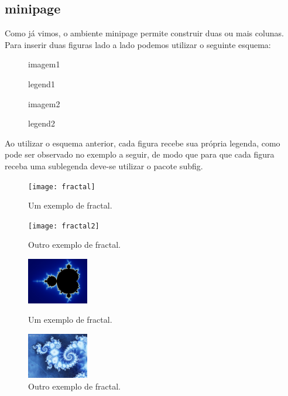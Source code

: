 \subsection{\textsf{minipage}}

Como já vimos, o ambiente \textsf{minipage} permite construir duas ou mais colunas. Para inserir duas figuras lado a lado podemos utilizar o seguinte esquema:
\begin{latexcode}
    \begin{figure}[place]
        \begin{minipage}[pos]{width}
            imagem1
            \caption{legend1}
            \label{P:imagem1}
        \end{minipage}\hfill
        \begin{minipage}[pos]{width}
            imagem2
            \caption{legend2}
            \label{P:imagem2}
        \end{minipage}
    \end{figure}
\end{latexcode}

Ao utilizar o esquema anterior, cada figura recebe sua própria legenda, como pode ser observado no exemplo a seguir, de modo que para que cada figura receba uma sublegenda deve-se utilizar o pacote \textsf{subfig}.
\begin{latexcode}
    \begin{figure}[h!]
        \begin{minipage}[t]{0.47\linewidth}
            \centering
            \texttt{[image: fractal]}
            \caption{Um exemplo de fractal.}
        \end{minipage} \hfill
        \begin{minipage}[t]{0.47\linewidth}
            \centering
            \texttt{[image: fractal2]}
            \caption{Outro exemplo de fractal.}
        \end{minipage}
    \end{figure}
\end{latexcode}
\begin{figure}[h!]
    \begin{minipage}[t]{0.47\linewidth}
        \centering
        \includegraphics[height=2cm]{figures/fractal}
        \caption{Um exemplo de fractal.}
    \end{minipage} \hfill
    \begin{minipage}[t]{0.47\linewidth}
        \centering
        \includegraphics[height=2cm]{figures/fractal2}
        \caption{Outro exemplo de fractal.}
    \end{minipage}
\end{figure}


